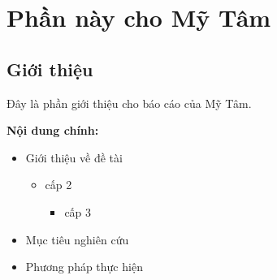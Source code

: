 \section{Phần này cho Mỹ Tâm}
\subsection{Giới thiệu}
Đây là phần giới thiệu cho báo cáo của Mỹ Tâm.

\textbf{Nội dung chính:}
\begin{itemize}
	\item Giới thiệu về đề tài
	\begin{itemize}
        \item cấp 2
        \begin{itemize}
            \item cấp 3
        \end{itemize}
    \end{itemize}
	\item Mục tiêu nghiên cứu
	\item Phương pháp thực hiện
\end{itemize}